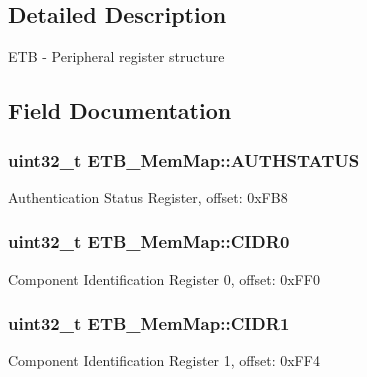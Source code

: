 \subsection{Detailed Description}
E\+T\+B -\/ Peripheral register structure 

\subsection{Field Documentation}
\hypertarget{struct_e_t_b___mem_map_a446ff3dd57fdb7ef19dcb892d05455a7}{}
\subsubsection[{A\+U\+T\+H\+S\+T\+A\+T\+U\+S}]{\setlength{\rightskip}{0pt plus 5cm}uint32\+\_\+t E\+T\+B\+\_\+\+Mem\+Map\+::\+A\+U\+T\+H\+S\+T\+A\+T\+U\+S}\label{struct_e_t_b___mem_map_a446ff3dd57fdb7ef19dcb892d05455a7}
Authentication Status Register, offset\+: 0x\+F\+B8 \hypertarget{struct_e_t_b___mem_map_a084d9f4d6b483f57a07d844cf1bf18d7}{}
\subsubsection[{C\+I\+D\+R0}]{\setlength{\rightskip}{0pt plus 5cm}uint32\+\_\+t E\+T\+B\+\_\+\+Mem\+Map\+::\+C\+I\+D\+R0}\label{struct_e_t_b___mem_map_a084d9f4d6b483f57a07d844cf1bf18d7}
Component Identification Register 0, offset\+: 0x\+F\+F0 \hypertarget{struct_e_t_b___mem_map_afc0480cceefc94fc8b2e730bb04cfd4f}{}
\subsubsection[{C\+I\+D\+R1}]{\setlength{\rightskip}{0pt plus 5cm}uint32\+\_\+t E\+T\+B\+\_\+\+Mem\+Map\+::\+C\+I\+D\+R1}\label{struct_e_t_b___mem_map_afc0480cceefc94fc8b2e730bb04cfd4f}
Component Identification Register 1, offset\+: 0x\+F\+F4 \hypertarget{struct_e_t_b___mem_map_a21c4d78f89b6495cdcd781c34f483f42}{}
